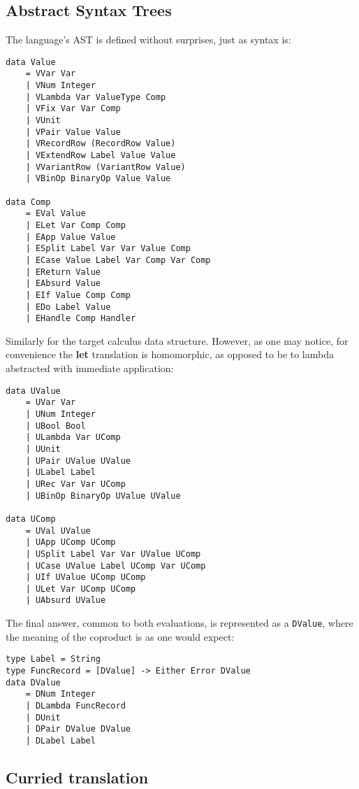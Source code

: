 \documentclass{article}
\theoremstyle{definition}
\theoremstyle{lemma}
\theoremstyle{observation}
\theoremstyle{theorem}
\begin{document}
    \subsection{Abstract Syntax Trees}
    \label{sec:ast}

    The language's AST is defined without surprises, just as syntax is:

    \begin{verbatim}
data Value
    = VVar Var
    | VNum Integer
    | VLambda Var ValueType Comp
    | VFix Var Var Comp
    | VUnit
    | VPair Value Value
    | VRecordRow (RecordRow Value)
    | VExtendRow Label Value Value
    | VVariantRow (VariantRow Value)
    | VBinOp BinaryOp Value Value

data Comp
    = EVal Value
    | ELet Var Comp Comp
    | EApp Value Value
    | ESplit Label Var Var Value Comp
    | ECase Value Label Var Comp Var Comp
    | EReturn Value
    | EAbsurd Value
    | EIf Value Comp Comp
    | EDo Label Value
    | EHandle Comp Handler
    \end{verbatim}
    Similarly for the target calculus data structure. However, as one may notice,
    for convenience the \textbf{let} translation is homomorphic, as opposed to be
    to lambda abstracted with immediate application:

    \begin{verbatim}
data UValue
    = UVar Var
    | UNum Integer
    | UBool Bool
    | ULambda Var UComp
    | UUnit
    | UPair UValue UValue
    | ULabel Label
    | URec Var Var UComp
    | UBinOp BinaryOp UValue UValue

data UComp
    = UVal UValue
    | UApp UComp UComp
    | USplit Label Var Var UValue UComp
    | UCase UValue Label UComp Var UComp
    | UIf UValue UComp UComp
    | ULet Var UComp UComp
    | UAbsurd UValue

    \end{verbatim}
    The final answer, common to both evaluations, is represented as a \verb!DValue!,
    where the meaning of the coproduct is as one would expect:

    \begin{verbatim}
type Label = String
type FuncRecord = [DValue] -> Either Error DValue
data DValue
    = DNum Integer
    | DLambda FuncRecord
    | DUnit
    | DPair DValue DValue
    | DLabel Label
    \end{verbatim}

    \subsection{Curried translation}
\end{document}
